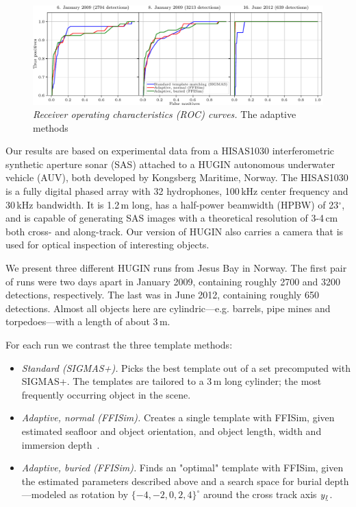 \begin{figure}[t]\centering%
\includegraphics[width=\linewidth]{gfx/fig_rocs.pdf}%
\caption{\emph{Receiver operating characteristics (ROC) curves.} The adaptive methods }\label{IV_fig_roc_curves}%
\end{figure}

Our results are based on experimental data from a HISAS1030 interferometric synthetic aperture sonar (SAS) attached to a HUGIN autonomous underwater vehicle (AUV), both developed by Kongsberg Maritime, Norway. The HISAS1030 is a fully digital phased array with 32 hydrophones, 100\,kHz center frequency and 30\,kHz bandwidth. It is 1.2\,m long, has a half-power beamwidth (HPBW) of 23$^\circ$, and is capable of generating SAS images with a theoretical resolution of 3-4\,cm both cross- and along-track. Our version of HUGIN also carries a camera that is used for optical inspection of interesting objects.


We present three different HUGIN runs from Jesus Bay in Norway. The first pair of runs were two days apart in January 2009, containing roughly 2700 and 3200 detections, respectively. The last was in June 2012, containing roughly 650 detections. Almost all objects here are cylindric---e.g. barrels, pipe mines and torpedoes---with a length of about 3\,m.

For each run we contrast the three template methods:
%
\begin{itemize}
\item \emph{Standard (SIGMAS+).} Picks the best template out of a set precomputed with SIGMAS+. The templates are tailored to a 3\,m long cylinder; the most frequently occurring object in the scene.
\item \emph{Adaptive, normal (FFISim).} Creates a single template with FFISim, given estimated seafloor and object orientation, and object length, width and immersion depth~\cite{Midelfart2010}. 
\item \emph{Adaptive, buried (FFISim).} Finds an "optimal" template with FFISim, given the estimated parameters described above and a search space for burial depth---modeled as rotation by $\{-4,-2,0,2,4\}^\circ$ around the cross track axis $y_\textrm{\tiny$\uvec{I}$}$.
\end{itemize}

